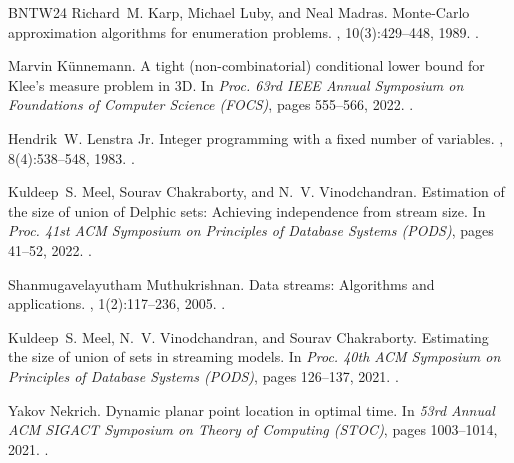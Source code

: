 \documentclass[11pt]{article}
\begin{document}
\begin{thebibliography}{BNTW24}
Richard~M. Karp, Michael Luby, and Neal Madras.
\newblock Monte-{C}arlo approximation algorithms for enumeration problems.
, 10(3):429--448, 1989.
\newblock \href {https://doi.org/10.1016/0196-6774(89)90038-2}
  {}.

Marvin K{\"{u}}nnemann.
\newblock A tight (non-combinatorial) conditional lower bound for {K}lee's
  measure problem in {3D}.
\newblock In {\em Proc. 63rd {IEEE} Annual Symposium on Foundations of Computer
  Science (FOCS)}, pages 555--566, 2022.
\newblock \href {https://doi.org/10.1109/FOCS54457.2022.00059}
  {}.

Hendrik~W. {Lenstra Jr.}
\newblock Integer programming with a fixed number of variables.
, 8(4):538--548, 1983.
\newblock \href {https://doi.org/10.1287/moor.8.4.538}
  {}.

Kuldeep~S. Meel, Sourav Chakraborty, and N.~V. Vinodchandran.
\newblock Estimation of the size of union of {D}elphic sets: Achieving
  independence from stream size.
\newblock In {\em Proc. 41st ACM Symposium on Principles of Database Systems
  (PODS)}, pages 41--52, 2022.
\newblock \href {https://doi.org/10.1145/3517804.3526222}
  {}.

Shanmugavelayutham Muthukrishnan.
\newblock Data streams: Algorithms and applications.
, 1(2):117--236, 2005.
\newblock \href {https://doi.org/10.1561/0400000002}
  {}.

Kuldeep~S. Meel, N.~V. Vinodchandran, and Sourav Chakraborty.
\newblock Estimating the size of union of sets in streaming models.
\newblock In {\em Proc. 40th ACM Symposium on Principles of Database Systems
  (PODS)}, pages 126--137, 2021.
\newblock \href {https://doi.org/10.1145/3452021.3458333}
  {}.

Yakov Nekrich.
\newblock Dynamic planar point location in optimal time.
\newblock In {\em 53rd Annual {ACM} {SIGACT} Symposium on Theory of Computing
  ({STOC})}, pages 1003--1014, 2021.
\newblock \href {https://doi.org/10.1145/3406325.3451100}
  {}.


\end{thebibliography}
\end{document}
